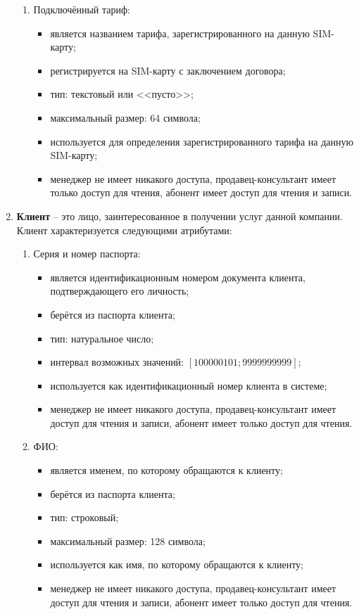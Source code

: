 \begin{enumerate}
\begin{enumerate}
        \item Подключённый тариф:
        \begin{itemize}
            \item является названием тарифа, зарегистрированного на данную SIM-карту;
            \item регистрируется на SIM-карту с заключением договора;
            \item тип: текстовый или <<пусто>>;
            \item максимальный размер: 64 символа; %
            \item используется для определения зарегистрированного тарифа на данную SIM-карту;
            \item менеджер не имеет никакого доступа, продавец-консультант имеет только доступ для чтения, абонент имеет доступ для чтения и записи.
        \end{itemize}
    \end{enumerate}

    \item \textbf{Клиент} -- это лицо, заинтересованное в получении услуг данной компании. Клиент характеризуется следующими атрибутами:
    \begin{enumerate}
        \item Серия и номер паспорта:
        \begin{itemize}
            \item является идентификационным номером документа клиента, подтверждающего его личность;
            \item берётся из паспорта клиента;
            \item тип: натуральное число;
            \item интервал возможных значений: $[100 000 101; 9 999 999 999]$;
            \item используется как идентификационный номер клиента в системе;
            \item менеджер не имеет никакого доступа, продавец-консультант имеет доступ для чтения и записи, абонент имеет только доступ для чтения.
        \end{itemize}

        \item ФИО:
        \begin{itemize}
            \item является именем, по которому обращаются к клиенту;
            \item берётся из паспорта клиента;
            \item тип: строковый;
            \item максимальный размер: 128 символа;
            \item используется как имя, по которому обращаются к клиенту;
            \item менеджер не имеет никакого доступа, продавец-консультант имеет доступ для чтения и записи, абонент имеет только доступ для чтения.
        \end{itemize}


\end{enumerate}
\end{enumerate}

